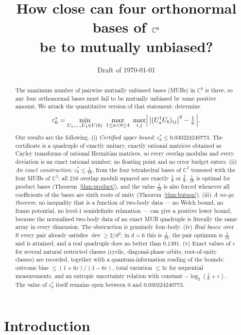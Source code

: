 \documentclass[11pt,a4paper]{article}
\title{\bf How close can four orthonormal bases of $\C^6$\\ be to mutually unbiased?}
\author{}
\date{Draft of \today}
\theoremstyle{remark}
\newcommand{\C}{\mathbb{C}}
\newcommand{\R}{\mathbb{R}}
\newcommand{\dev}{\operatorname{dev}}
\newcommand{\eps}{\varepsilon}
\begin{document}
\maketitle

\begin{abstract}
\noindent
The maximum number of pairwise mutually unbiased bases (MUBs) in $\C^6$ is three, so any
four orthonormal bases must fail to be mutually unbiased by some positive amount.  We attack
the quantitative version of that statement: determine
\[
\eps_6^*=\min_{U_1,\dots,U_4\in U(6)}\ \max_{1\le a<b\le4}\ \max_{i,j}
\Bigl|\,\bigl|(U_a^\dagger U_b)_{ij}\bigr|^2-\tfrac16\,\Bigr| .
\]
Our results are the following.
(i) \emph{Certified upper bound:} $\eps_6^*\le 0.030224240773$.  The certificate is a
quadruple of exactly unitary, exactly rational matrices obtained as Cayley transforms of
rational Hermitian matrices, so every overlap modulus and every deviation is an exact
rational number; no floating point and no error budget enters.
(ii) \emph{An exact construction:} $\eps_6^*\le\tfrac1{18}$, from the four tetrahedral bases
of $\C^2$ tensored with the four MUBs of $\C^3$; all $216$ overlap moduli squared are exactly
$\tfrac19$ or $\tfrac29$.  $\tfrac1{18}$ is optimal for product bases
(Theorem~\ref{thm:product}), and the value $\tfrac1{18}$ is also forced whenever all
coefficients of the bases are sixth roots of unity (Theorem~\ref{thm:butson}).
(iii) \emph{A no-go theorem:} no inequality that is a function of two-body data --- no Welch
bound, no frame potential, no level-$1$ semidefinite relaxation --- can give a positive lower
bound, because the normalised two-body data of an exact MUB quadruple is literally the same
array in every dimension.  The obstruction is genuinely four-body.
(iv) \emph{Real bases:} over $\R$ every pair already satisfies $\dev\ge2/d^2$; in $d=6$ this
is $\tfrac1{18}$, the pair optimum is $\tfrac1{12}$ and is attained, and a real quadruple
does no better than $0.1391$.
(v) Exact values of $\eps$ for several natural restricted classes (cyclic, diagonal-phase
orbits, root-of-unity classes) are recorded, together with a quantum-information reading of
the bounds: outcome bias $\le(1+6\eps)/(1-6\eps)$, total variation $\le 3\eps$ for sequential
measurements, and an entropic uncertainty relation with constant $-\log_2(\tfrac16+\eps)$.
The value of $\eps_6^*$ itself remains open between $0$ and $0.030224240773$.
\end{abstract}

\tableofcontents

\section{Introduction}
\end{document}
